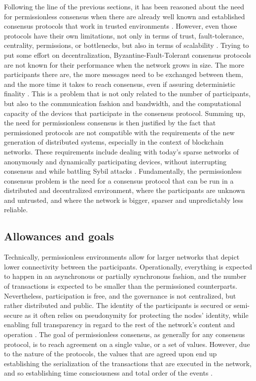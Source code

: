 \documentclass[journal]{IEEEtran}
\begin{document}
Following the line of the previous sections, it has been reasoned about the need 
for permissionless consensus when there are already well known and established consensus protocols
that work in trusted environments \cite{castro1999practical, miller2016honey}. However, even those protocols have
their own limitations, not only in terms of trust, fault-tolerance, centrality, permissions,
or bottlenecks, but also in terms of scalability \cite{miller2016honey}. Trying to put some effort on decentralization, 
Byzantine-Fault-Tolerant consensus protocols are not known for their performance when the network grows
in size. The more participants there are, the more messages need to be exchanged
between them, and the more time it takes to reach consensus, even if assuring deterministic finality \cite{decker2016bitcoin}. 
This is a problem that is not only related to the number of participants, but also to the
communication fashion and bandwidth, and the computational capacity of the devices that
participate in the consensus protocol. 
Summing up, the need for permissionless consensus is then justified by the fact that
permissioned protocols are not compatible with the requirements of the new generation of
distributed systems, especially in the context of blockchain networks. 
These requirements include dealing with today's sparse networks of anonymously and dynamically
participating devices, without interrupting consensus and while battling Sybil attacks \cite{8629877, survey-dist-consensus}.
Fundamentally, the permissionless consensus problem is the need for a consensus protocol that
can be run in a distributed and decentralized environment, where the participants are unknown and untrusted,
and where the network is bigger, sparser and unpredictably less reliable.

\subsection{Allowances and goals}

Technically, permissionless environments allow for larger networks
that depict lower connectivity between the participants. Operationally,
everything is expected to happen in an asynchronous or partially synchronous fashion, 
and the number of transactions is expected to be smaller than the 
permissioned counterparts. Nevertheless, participation is free, and the
governance is not centralized, but rather distributed and public. 
The identity of the participants is secured or semi-secure as it often relies on
pseudonymity for protecting the nodes' identity, while enabling full transparency 
in regard to the rest of the network's content and operation \cite{xiao2019distributed}.
The goal of permissionless consensus, as generally for any consensus protocol, is to reach
agreement on a single value, or a set of values. However, due to the nature of the
protocols, the values that are agreed upon end up establishing the serialization of the
transactions that are executed in the network, and so establishing time consciousness and 
total order of the events \cite{8629877}.
\end{document}
